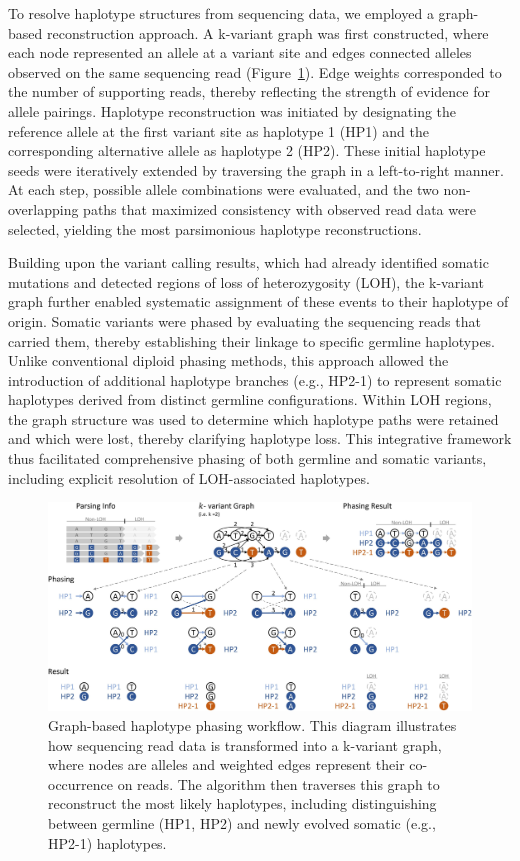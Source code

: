 \documentclass[pdflatex,sn-nature]{sn-jnl}
\def\pandocbounded#1{%
  \begingroup
  \setkeys{Gin}{width=1.0\linewidth,height=1.0\textheight,keepaspectratio}%
  #1%
  \endgroup
}
\begin{document}
To resolve haplotype structures from sequencing data, we employed a graph-based reconstruction approach. A k-variant graph was first constructed, where each node represented an allele at a variant site and edges connected alleles observed on the same sequencing read (Figure~\ref{fig:met-page-24-cropped-jpg}). Edge weights corresponded to the number of supporting reads, thereby reflecting the strength of evidence for allele pairings. Haplotype reconstruction was initiated by designating the reference allele at the first variant site as haplotype 1 (HP1) and the corresponding alternative allele as haplotype 2 (HP2). These initial haplotype seeds were iteratively extended by traversing the graph in a left-to-right manner. At each step, possible allele combinations were evaluated, and the two non-overlapping paths that maximized consistency with observed read data were selected, yielding the most parsimonious haplotype reconstructions.

Building upon the variant calling results, which had already identified somatic mutations and detected regions of loss of heterozygosity (LOH), the k-variant graph further enabled systematic assignment of these events to their haplotype of origin. Somatic variants were phased by evaluating the sequencing reads that carried them, thereby establishing their linkage to specific germline haplotypes. Unlike conventional diploid phasing methods, this approach allowed the introduction of additional haplotype branches (e.g., HP2-1) to represent somatic haplotypes derived from distinct germline configurations. Within LOH regions, the graph structure was used to determine which haplotype paths were retained and which were lost, thereby clarifying haplotype loss. This integrative framework thus facilitated comprehensive phasing of both germline and somatic variants, including explicit resolution of LOH-associated haplotypes.

\begin{figure}
\centering
\pandocbounded{\includegraphics[keepaspectratio]{page_24_cropped.jpg}}
\caption[Haplotype Phasing Workflow]{Graph-based haplotype phasing workflow. This diagram illustrates how sequencing read data is transformed into a k-variant graph, where nodes are alleles and weighted edges represent their co-occurrence on reads. The algorithm then traverses this graph to reconstruct the most likely haplotypes, including distinguishing between germline (HP1, HP2) and newly evolved somatic (e.g., HP2-1) haplotypes.}\label{fig:met-page-24-cropped-jpg}
\end{figure}
\end{document}
